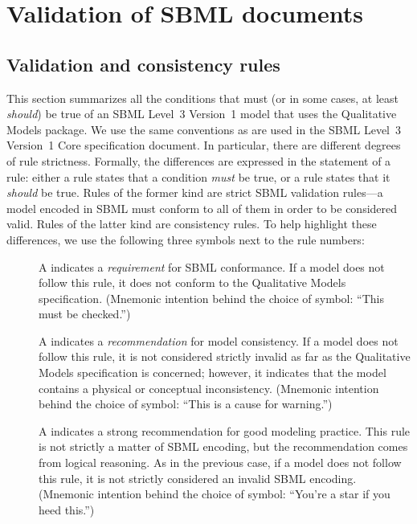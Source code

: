 
\section{Validation of SBML documents}
\label{apdx-validation}

\subsection{Validation and consistency rules}
\label{validation-rules}

This section summarizes all the conditions that must (or in some cases,
at least \emph{should}) be true of an SBML Level~3 Version~1 model that
uses the Qualitative Models package.  We use the same
conventions as are used in the SBML Level~3 Version~1 Core specification
document.  In particular, there are different degrees of rule
strictness.  Formally, the differences are expressed in the statement of
a rule: either a rule states that a condition \emph{must} be true, or a
rule states that it \emph{should} be true.  Rules of the former kind are
strict SBML validation rules---a model encoded in SBML must conform to
all of them in order to be considered valid.  Rules of the latter kind
are consistency rules.  To help highlight these differences, we use the
following three symbols next to the rule numbers:

\begin{description}

\item[\hspace*{6.5pt}\vSymbol\vsp] A \vSymbolName indicates a
  \emph{requirement} for SBML conformance. If a model does not follow
  this rule, it does not conform to the Qualitative Models
  specification.  (Mnemonic intention behind the choice of symbol:
  ``This must be checked.'')

\item[\hspace*{6.5pt}\cSymbol\csp] A \cSymbolName indicates a
  \emph{recommendation} for model consistency.  If a model does not
  follow this rule, it is not considered strictly invalid as far as
  the Qualitative Models specification is concerned;
  however, it indicates that the model contains a physical or
  conceptual inconsistency.  (Mnemonic intention behind the choice of
  symbol: ``This is a cause for warning.'')

\item[\hspace*{6.5pt}\mSymbol\msp] A \mSymbolName indicates a strong
  recommendation for good modeling practice.  This rule is not
  strictly a matter of SBML encoding, but the recommendation comes
  from logical reasoning.  As in the previous case, if a model does
  not follow this rule, it is not strictly considered an invalid SBML
  encoding.  (Mnemonic intention behind the choice of symbol: ``You're
  a star if you heed this.'')

\end{description}

